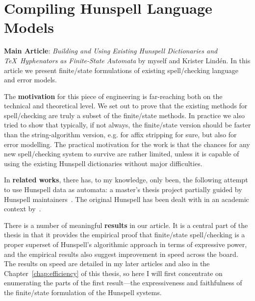 \documentclass[officiallayout]{unihelcompling}
\begin{document}
\section{Compiling Hunspell Language Models}
\label{sec:Hunspell}

\textbf{Main Article}: \emph{Building and Using Existing Hunspell Dictionaries
and \TeX\ Hyphenators as Finite-State Automata} by myself and Krister Lindén.
In this article we present finite\-/state formulations of existing spell\-/checking
language and error models.

The \textbf{motivation} for this piece of engineering is far-reaching both on
the technical and theoretical level. We set out to prove that the existing
methods for spell\-/checking are truly a subset of the finite\-/state methods.
In practice we also tried to show that typically, if not always, the
finite\-/state version should be faster than the string-algorithm version, e.g. for
affix stripping for sure, but also for error modelling. The practical
motivation for the work is that the chances for any new spell\-/checking
system to survive are rather limited, unless it is capable of using the
existing Hunspell dictionaries without major difficulties.

In \textbf{related works}, there has, to my knowledge, only been, the following
attempt to use Hunspell data as automata: a master's thesis project partially
guided by Hunspell maintainers~\citep{greenfield2010open}.
The
original Hunspell has been dealt with in an academic context 
by~\citet{tron2005hunmorph}.

There is a number of meaningful \textbf{results} in our article. It
is a central part of the thesis in that it provides the empirical proof that
finite\-/state spell\-/checking is a proper superset of Hunspell's algorithmic 
approach in terms of expressive power, and the empirical results also suggest
improvement in speed across the board. The results on speed are detailed in my
later articles and also in the Chapter~\ref{chap:efficiency} of this thesis,
so here I will first concentrate on enumerating the parts of the first
result---the expressiveness and faithfulness of the finite\-/state formulation of
the Hunspell systems.
\end{document}

